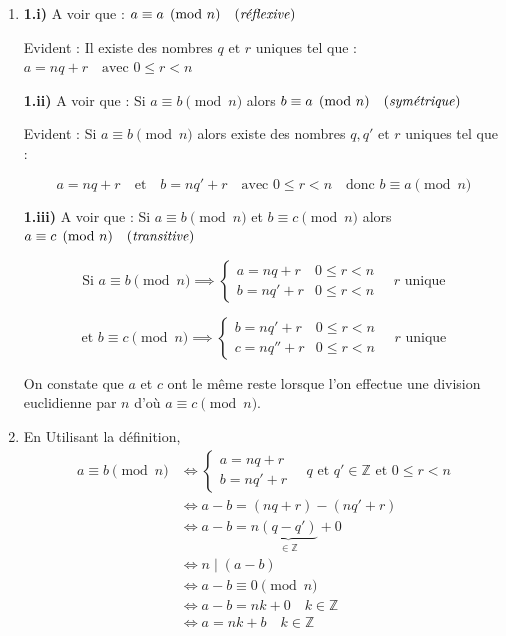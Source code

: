 \vspace{4mm}
\begin{enumerate}
  \item \textbf{1.i)} A voir que : $a \equiv a \pmod n \quad (\text{\textit{réflexive}})$
  
  Evident : Il existe des nombres $q \text{ et } r$ uniques tel que : $a = nq + r \quad \text{avec } 0 \le r < n$
  
  \vspace{0.3cm}
  
  \textbf{1.ii)} A voir que : Si $a \equiv b  \pmod n$ alors $b \equiv a  \pmod n \quad (\text{\textit{symétrique}})$
  
  Evident : Si $a \equiv b  \pmod n$ alors existe des nombres $q, q' \text{ et } r$ uniques tel que :
  
  $$a = nq + r \quad \text{et} \quad b = nq' + r \quad \text{avec } 0 \le r < n \quad \text{donc } b \equiv a  \pmod n$$
  
  \vspace{0.3cm}
  
  \textbf{1.iii)} A voir que : Si $a \equiv b  \pmod n$ et $b \equiv c  \pmod n$ alors $a \equiv c  \pmod n \quad (\text{\textit{transitive}})$
  
  $$\text{Si } a \equiv b  \pmod n \implies \begin{cases} a = nq + r & 0 \le r < n \\ b = nq' + r & 0 \le r < n \end{cases} \quad r \text{ unique}$$
  
  $$\text{et } b \equiv c  \pmod n \implies \begin{cases} b = nq' + r & 0 \le r < n \\ c = nq'' + r & 0 \le r < n \end{cases} \quad r \text{ unique}$$
  
  On constate que $a$ et $c$ ont le même reste lorsque l'on effectue une division euclidienne par $n$ d'où $a \equiv c  \pmod n$.
  \item  En Utilisant la définition,
  \begin{align*}
  	a \equiv b  \pmod n &\iff \begin{cases} a = nq + r \\ b = nq' + r \end{cases} \quad q \text{ et } q' \in \mathbb{Z} \text{ et } 0 \le r < n \\
  	&\iff a - b = (nq + r) - (nq' + r)\\
  	&\iff a - b = n \underbrace{(q - q')}_{\in \mathbb{Z}} + 0\\
  	&\iff n \mid (a - b)\\
  	&\iff a - b \equiv 0  \pmod n\\
  	&\iff a - b = nk + 0 \quad k \in \mathbb{Z}\\
  	&\iff a = nk + b \quad k \in \mathbb{Z}
  \end{align*}


\end{enumerate}
